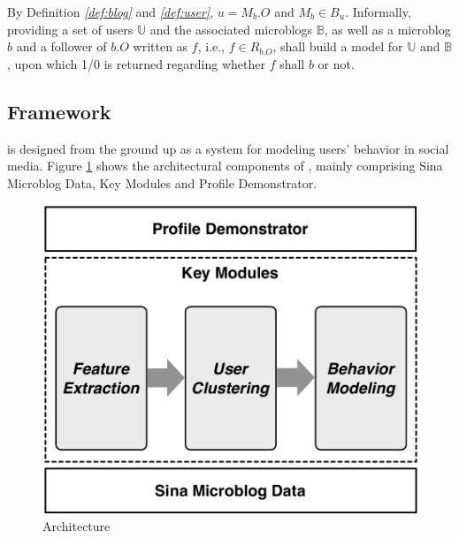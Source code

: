 By Definition \textit{\ref{def:blog}} and \textit{\ref{def:user}}, $u = M_b.O$ and $M_b \in B_u$.
%
Informally, providing a set of users $\mathbb{U}$ and the associated microblogs $\mathbb{B}$, as well as a microblog $b$ and a follower of $b.O$ written as $f$, i.e., $f \in R_{b.O}$, \sys{} shall build a \retg{} model for $\mathbb{U}$ and $\mathbb{B}$, upon which 1/0 is returned regarding whether $f$ shall \ret{} $b$ or not.


\subsection{\sys{} Framework}
\sys{} is designed from the ground up as a system for modeling users' \retg{} behavior in social media.
Figure \ref{fig:framework} shows the architectural components of \sys{}, mainly comprising Sina Microblog Data, Key Modules and Profile Demonstrator.

\begin{figure}[tb!]
\centering
\includegraphics[width=.7\linewidth]{figures/architecture.pdf}
\caption{\sys{} Architecture}
\label{fig:framework}
\end{figure}

